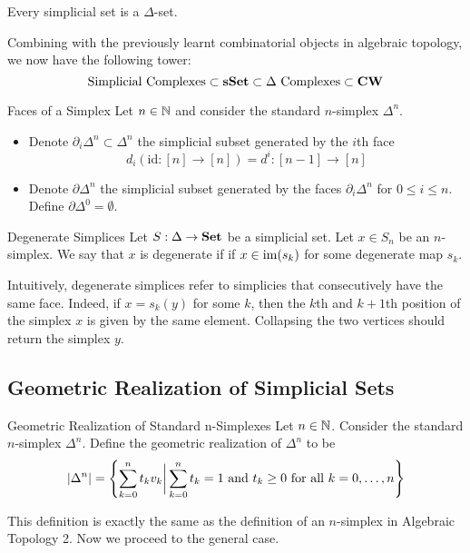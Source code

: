 \documentclass[a4paper]{article}
\begin{document}
\begin{prp}{}{} Every simplicial set is a $\Delta$-set. 
\end{prp}

Combining with the previously learnt combinatorial objects in algebraic topology, we now have the following tower:  $$\text{Simplicial Complexes}\subset\bold{sSet}\subset\Delta\text{ Complexes}\subset\bold{CW}$$

\begin{defn}{Faces of a Simplex}{} Let $n\in\mathbb{N}$ and consider the standard $n$-simplex $\Delta^n$. 
\begin{itemize}
\item Denote $\partial_i\Delta^n\subset\Delta^n$ the simplicial subset generated by the $i$th face $$d_i(\text{id}:[n]\to[n])=d^i:[n-1]\to[n]$$
\item Denote $\partial\Delta^n$ the simplicial subset generated by the faces $\partial_i\Delta^n$ for $0\leq i\leq n$. Define $\partial\Delta^0=\emptyset$. 
\end{itemize}
\end{defn}

\begin{defn}{Degenerate Simplices}{} Let $S:\Delta\to\bold{Set}$ be a simplicial set. Let $x\in S_n$ be an $n$-simplex. We say that $x$ is degenerate if if $x\in\operatorname{im}(s_k)$ for some degenerate map $s_k$. 
\end{defn}

Intuitively, degenerate simplices refer to simplicies that consecutively have the same face. Indeed, if $x=s_k(y)$ for some $k$, then the $k$th and $k+1$th position of the simplex $x$ is given by the same element. Collapsing the two vertices should return the simplex $y$. 

\subsection{Geometric Realization of Simplicial Sets}
\begin{defn}{Geometric Realization of Standard n-Simplexes}{} Let $n\in\mathbb{N}$. Consider the standard $n$-simplex $\Delta^n$. Define the geometric realization of $\Delta^n$ to be $$\abs{\Delta^n}=\left\{\sum_{k=0}^nt_kv_k\bigg{|}\sum_{k=0}^nt_k=1\text{ and }t_k\geq 0\text{ for all }k=0,\dots,n\right\}$$
\end{defn}

This definition is exactly the same as the definition of an $n$-simplex in Algebraic Topology 2. Now we proceed to the general case. 
\end{document}

